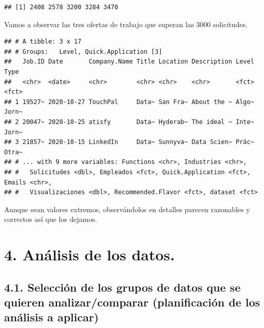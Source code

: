 \documentclass[
]{article}
\newenvironment{Shaded}{\begin{snugshade}}{\end{snugshade}}
\newcommand{\DecValTok}[1]{\textcolor[rgb]{0.86,0.86,0.80}{#1}}
\newcommand{\KeywordTok}[1]{\textcolor[rgb]{0.94,0.87,0.69}{#1}}
\newcommand{\NormalTok}[1]{\textcolor[rgb]{0.80,0.80,0.80}{#1}}
\newcommand{\OperatorTok}[1]{\textcolor[rgb]{0.94,0.94,0.82}{#1}}
\newcommand{\StringTok}[1]{\textcolor[rgb]{0.80,0.58,0.58}{#1}}
\begin{document}
\begin{verbatim}
## [1] 2408 2578 3200 3284 3470
\end{verbatim}

Vamos a observar las tres ofertas de trabajo que superan las 3000
solicitudes.

\begin{Shaded}
\end{Shaded}

\begin{verbatim}
## # A tibble: 3 x 17
## # Groups:   Level, Quick.Application [3]
##   Job.ID Date       Company.Name Title Location Description Level Type 
##   <chr>  <date>     <chr>        <chr> <chr>    <chr>       <fct> <fct>
## 1 19527~ 2020-10-27 TouchPal     Data~ San Fra~ About the ~ Algo~ Jorn~
## 2 20047~ 2020-10-25 atisfy       Data~ Hyderab~ The ideal ~ Inte~ Jorn~
## 3 21857~ 2020-10-15 LinkedIn     Data~ Sunnyva~ Data Scien~ Prác~ Otra~
## # ... with 9 more variables: Functions <chr>, Industries <chr>,
## #   Solicitudes <dbl>, Empleados <fct>, Quick.Application <fct>, Emails <chr>,
## #   Visualizaciones <dbl>, Recommended.Flavor <fct>, dataset <fct>
\end{verbatim}

Aunque sean valores extremos, observándolos en detalles parecen
razonables y correctos así que los dejamos.

\hypertarget{analisis-de-los-datos.}{%
\section{4. Análisis de los datos.}\label{analisis-de-los-datos.}}

\hypertarget{selecciuxf3n-de-los-grupos-de-datos-que-se-quieren-analizarcomparar-planificaciuxf3n-de-los-anuxe1lisis-a-aplicar}{%
\subsection{4.1. Selección de los grupos de datos que se quieren
analizar/comparar (planificación de los análisis a
aplicar)}\label{selecciuxf3n-de-los-grupos-de-datos-que-se-quieren-analizarcomparar-planificaciuxf3n-de-los-anuxe1lisis-a-aplicar}}
\end{document}
